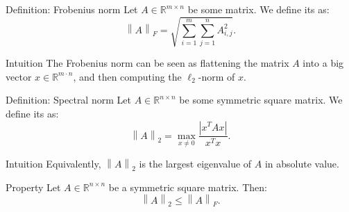 \documentclass[a4paper]{article}
\begin{document}
\begin{parag}{Definition: Frobenius norm}
    Let $A \in \mathbb{R}^{m \times n}$ be some matrix. We define its  as: 
    \[\left\|A\right\|_F = \sqrt{\sum_{i=1}^{m} \sum_{j=1}^{n} A_{i,j}^2}.\]
    
    \begin{subparag}{Intuition}
        The Frobenius norm can be seen as flattening the matrix $A$ into a big vector $x \in \mathbb{R}^{m\cdot n}$, and then computing the $\ell_2$-norm of $x$.
    \end{subparag}
\end{parag}

\begin{parag}{Definition: Spectral norm}
    Let $A \in \mathbb{R}^{n \times n }$ be some symmetric square matrix. We define its  as: 
    \[\left\|A\right\|_2 = \max_{x \neq 0} \frac{\left|x^T A x\right|}{x^T x}.\]

    \begin{subparag}{Intuition}
        Equivalently, $\left\|A\right\|_2$ is the largest eigenvalue of $A$ in absolute value.
    \end{subparag}
\end{parag}

\begin{parag}{Property}
    Let $A \in \mathbb{R}^{n \times n}$ be a symmetric square matrix. Then: 
    \[\left\|A\right\|_2 \leq \left\|A\right\|_F.\]
\end{parag}
\end{document}
